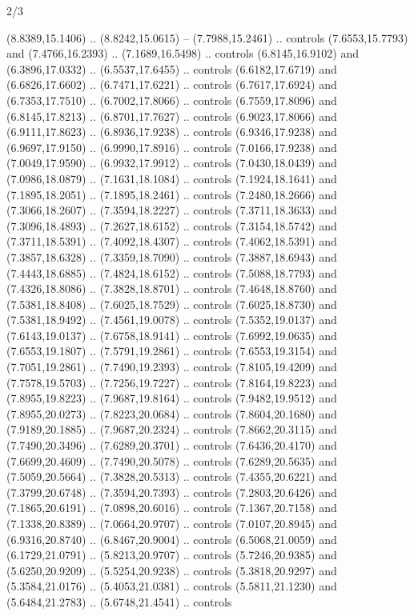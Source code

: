 \begin{flagdescription}{2/3}
\begin{scope}[yshift=\flagwidth,scale=\flagwidth/1241.93737]
\begin{scope}[y=-1mm, x=1mm,draw=gold,fill=blue,line join=miter,miter limit=4,line width=1.8\lw]
\begin{scope}[y=1mm, x=1mm, yscale=-1,shift={(573.68mm+\str,266.75)}]
\begin{scope}[scale=1.35,shift={(-9,-3)}]
  (8.8389,15.1406) .. (8.8242,15.0615) -- (7.7988,15.2461) .. controls
  (7.6553,15.7793) and (7.4766,16.2393) .. (7.1689,16.5498) .. controls
  (6.8145,16.9102) and (6.3896,17.0332) .. (6.5537,17.6455) .. controls
  (6.6182,17.6719) and (6.6826,17.6602) .. (6.7471,17.6221) .. controls
  (6.7617,17.6924) and (6.7353,17.7510) .. (6.7002,17.8066) .. controls
  (6.7559,17.8096) and (6.8145,17.8213) .. (6.8701,17.7627) .. controls
  (6.9023,17.8066) and (6.9111,17.8623) .. (6.8936,17.9238) .. controls
  (6.9346,17.9238) and (6.9697,17.9150) .. (6.9990,17.8916) .. controls
  (7.0166,17.9238) and (7.0049,17.9590) .. (6.9932,17.9912) .. controls
  (7.0430,18.0439) and (7.0986,18.0879) .. (7.1631,18.1084) .. controls
  (7.1924,18.1641) and (7.1895,18.2051) .. (7.1895,18.2461) .. controls
  (7.2480,18.2666) and (7.3066,18.2607) .. (7.3594,18.2227) .. controls
  (7.3711,18.3633) and (7.3096,18.4893) .. (7.2627,18.6152) .. controls
  (7.3154,18.5742) and (7.3711,18.5391) .. (7.4092,18.4307) .. controls
  (7.4062,18.5391) and (7.3857,18.6328) .. (7.3359,18.7090) .. controls
  (7.3887,18.6943) and (7.4443,18.6885) .. (7.4824,18.6152) .. controls
  (7.5088,18.7793) and (7.4326,18.8086) .. (7.3828,18.8701) .. controls
  (7.4648,18.8760) and (7.5381,18.8408) .. (7.6025,18.7529) .. controls
  (7.6025,18.8730) and (7.5381,18.9492) .. (7.4561,19.0078) .. controls
  (7.5352,19.0137) and (7.6143,19.0137) .. (7.6758,18.9141) .. controls
  (7.6992,19.0635) and (7.6553,19.1807) .. (7.5791,19.2861) .. controls
  (7.6553,19.3154) and (7.7051,19.2861) .. (7.7490,19.2393) .. controls
  (7.8105,19.4209) and (7.7578,19.5703) .. (7.7256,19.7227) .. controls
  (7.8164,19.8223) and (7.8955,19.8223) .. (7.9687,19.8164) .. controls
  (7.9482,19.9512) and (7.8955,20.0273) .. (7.8223,20.0684) .. controls
  (7.8604,20.1680) and (7.9189,20.1885) .. (7.9687,20.2324) .. controls
  (7.8662,20.3115) and (7.7490,20.3496) .. (7.6289,20.3701) .. controls
  (7.6436,20.4170) and (7.6699,20.4609) .. (7.7490,20.5078) .. controls
  (7.6289,20.5635) and (7.5059,20.5664) .. (7.3828,20.5313) .. controls
  (7.4355,20.6221) and (7.3799,20.6748) .. (7.3594,20.7393) .. controls
  (7.2803,20.6426) and (7.1865,20.6191) .. (7.0898,20.6016) .. controls
  (7.1367,20.7158) and (7.1338,20.8389) .. (7.0664,20.9707) .. controls
  (7.0107,20.8945) and (6.9316,20.8740) .. (6.8467,20.9004) .. controls
  (6.5068,21.0059) and (6.1729,21.0791) .. (5.8213,20.9707) .. controls
  (5.7246,20.9385) and (5.6250,20.9209) .. (5.5254,20.9238) .. controls
  (5.3818,20.9297) and (5.3584,21.0176) .. (5.4053,21.0381) .. controls
  (5.5811,21.1230) and (5.6484,21.2783) .. (5.6748,21.4541) .. controls

\end{scope}
\end{scope}
\end{scope}
\end{scope}
\end{flagdescription}
